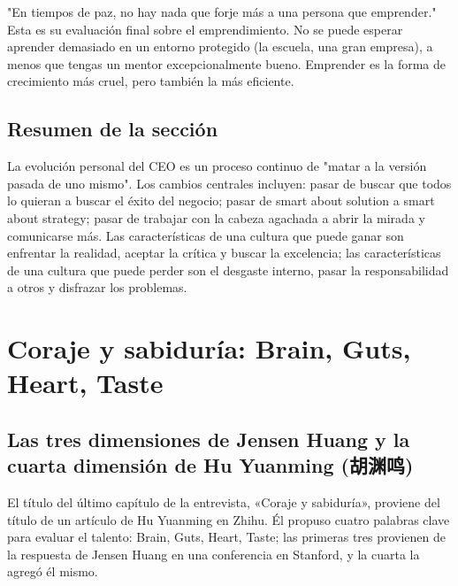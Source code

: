 \documentclass[a4paper]{article}
\begin{document}
"En tiempos de paz, no hay nada que forje más a una persona que emprender." Esta es su evaluación final sobre el emprendimiento. No se puede esperar aprender demasiado en un entorno protegido (la escuela, una gran empresa), a menos que tengas un mentor excepcionalmente bueno. Emprender es la forma de crecimiento más cruel, pero también la más eficiente.

\subsection{Resumen de la sección}

La evolución personal del CEO es un proceso continuo de "matar a la versión pasada de uno mismo". Los cambios centrales incluyen: pasar de buscar que todos lo quieran a buscar el éxito del negocio; pasar de smart about solution a smart about strategy; pasar de trabajar con la cabeza agachada a abrir la mirada y comunicarse más. Las características de una cultura que puede ganar son enfrentar la realidad, aceptar la crítica y buscar la excelencia; las características de una cultura que puede perder son el desgaste interno, pasar la responsabilidad a otros y disfrazar los problemas.
\section{Coraje y sabiduría: Brain, Guts, Heart, Taste}

\subsection{Las tres dimensiones de Jensen Huang y la cuarta dimensión de Hu Yuanming (胡渊鸣)}

El título del último capítulo de la entrevista, «Coraje y sabiduría», proviene del título de un artículo de Hu Yuanming en Zhihu. Él propuso cuatro palabras clave para evaluar el talento: Brain, Guts, Heart, Taste; las primeras tres provienen de la respuesta de Jensen Huang en una conferencia en Stanford, y la cuarta la agregó él mismo.
\end{document}
